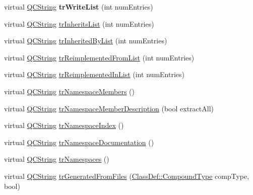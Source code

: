 \begin{DoxyCompactItemize}
\item 
\mbox{\label{class_translator_chinese_a3868f38015e02414b1b112099129770c}} 
virtual \mbox{\hyperlink{class_q_c_string}{Q\+C\+String}} {\bfseries tr\+Write\+List} (int num\+Entries)
\item 
virtual \mbox{\hyperlink{class_q_c_string}{Q\+C\+String}} \mbox{\hyperlink{class_translator_chinese_a62ac805a454546880c04bdf96c86b2ef}{tr\+Inherits\+List}} (int num\+Entries)
\item 
virtual \mbox{\hyperlink{class_q_c_string}{Q\+C\+String}} \mbox{\hyperlink{class_translator_chinese_ad901658ccf543f52a90800d8ad522550}{tr\+Inherited\+By\+List}} (int num\+Entries)
\item 
virtual \mbox{\hyperlink{class_q_c_string}{Q\+C\+String}} \mbox{\hyperlink{class_translator_chinese_a66515ccb68d26ac78c6159875c6d70d9}{tr\+Reimplemented\+From\+List}} (int num\+Entries)
\item 
virtual \mbox{\hyperlink{class_q_c_string}{Q\+C\+String}} \mbox{\hyperlink{class_translator_chinese_aeda3e83245e94e5d5001fb9bbb1fdf2f}{tr\+Reimplemented\+In\+List}} (int num\+Entries)
\item 
virtual \mbox{\hyperlink{class_q_c_string}{Q\+C\+String}} \mbox{\hyperlink{class_translator_chinese_a2453e0ff35e4589c30dbd5f10b6766d9}{tr\+Namespace\+Members}} ()
\item 
virtual \mbox{\hyperlink{class_q_c_string}{Q\+C\+String}} \mbox{\hyperlink{class_translator_chinese_a9f06d07379aa4f92170e5cc3a1f9ca04}{tr\+Namespace\+Member\+Description}} (bool extract\+All)
\item 
virtual \mbox{\hyperlink{class_q_c_string}{Q\+C\+String}} \mbox{\hyperlink{class_translator_chinese_aba5da30b8454852e2846ceb1fa0f619c}{tr\+Namespace\+Index}} ()
\item 
virtual \mbox{\hyperlink{class_q_c_string}{Q\+C\+String}} \mbox{\hyperlink{class_translator_chinese_a1c43cb8ee1dbfb68e27b2eb23c7b3bbf}{tr\+Namespace\+Documentation}} ()
\item 
virtual \mbox{\hyperlink{class_q_c_string}{Q\+C\+String}} \mbox{\hyperlink{class_translator_chinese_ac4e4e24dc07d2b0e9280afd35a4798f7}{tr\+Namespaces}} ()
\item 
virtual \mbox{\hyperlink{class_q_c_string}{Q\+C\+String}} \mbox{\hyperlink{class_translator_chinese_a3ce1f246a65c832b7ea858cde2711c07}{tr\+Generated\+From\+Files}} (\mbox{\hyperlink{class_class_def_ae70cf86d35fe954a94c566fbcfc87939}{Class\+Def\+::\+Compound\+Type}} comp\+Type, bool)

\end{DoxyCompactItemize}
